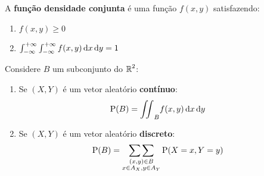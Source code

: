 \begin{definition}
    \label{def:ch03-fdp-2d}
    A \textbf{função densidade conjunta} é uma função 
    $f(x, y)$ satisfazendo:
    \begin{enumerate}
        \item $f(x, y) \geq 0$
        \item $\int_{-\infty}^{+\infty} \int_{-\infty}^{+\infty}
        f(x, y) \,\mathrm{d} x \,\mathrm{d} y = 1$
    \end{enumerate}
\end{definition}

Considere $B$ um subconjunto do $\operatorname{\mathbb{R}}^2$:
\begin{enumerate}
    \item Se $(X, Y)$ é um vetor aleatório \textbf{contínuo}:
    \begin{align*}
        \operatorname{P}(B) &= {\iint}_B f(x, y) \,\mathrm{d} x \,\mathrm{d} y
    \end{align*}
    \item Se $(X, Y)$ é um vetor aleatório \textbf{discreto}:
    \begin{align*}
        \operatorname{P}(B) &= \underset{\substack{(x,y)\in B\\x \in A_X, y\in A_Y}}{\sum\sum}
        \operatorname{P}(X = x, Y = y)
    \end{align*}
\end{enumerate}

